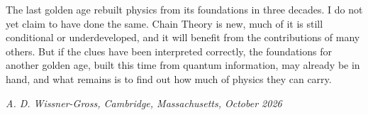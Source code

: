 The last golden age rebuilt physics from its foundations in three decades. I do not yet claim to have done the same. Chain Theory is new, much of it is still conditional or underdeveloped, and it will benefit from the contributions of many others. But if the clues have been interpreted correctly, the foundations for another golden age, built this time from quantum information, may already be in hand, and what remains is to find out how much of physics they can carry.

\begin{flushright}\textit{A. D. Wissner-Gross, Cambridge, Massachusetts, October 2026}\end{flushright}
